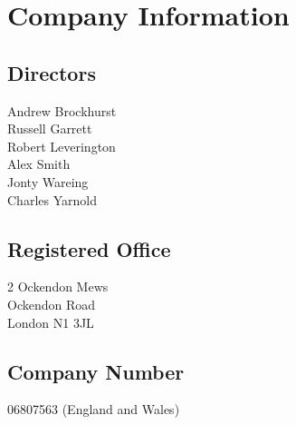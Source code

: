 \tableofcontents
\vfill
\section{Company Information}

\subsection{Directors}
Andrew Brockhurst \\
Russell Garrett \\
Robert Leverington \\
Alex Smith \\
Jonty Wareing \\
Charles Yarnold

\subsection{Registered Office}

2 Ockendon Mews \\
Ockendon Road \\
London N1 3JL

\subsection{Company Number}
06807563 (England and Wales)

